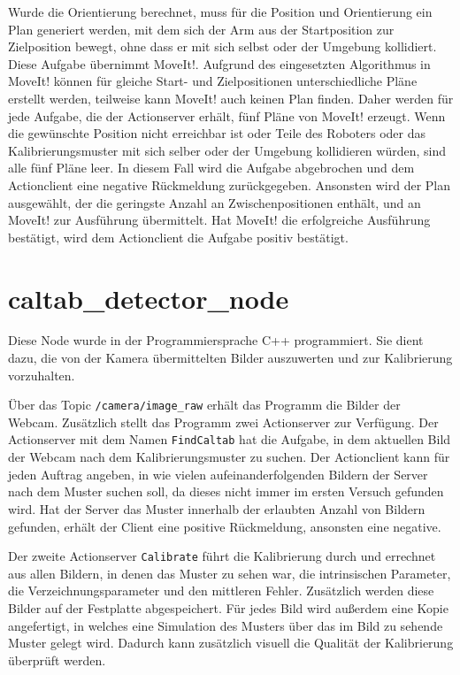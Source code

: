 Wurde die Orientierung berechnet, muss für die Position und Orientierung ein Plan generiert werden, mit dem sich der Arm aus der Startposition zur Zielposition bewegt, ohne dass er mit sich selbst oder der Umgebung kollidiert. Diese Aufgabe übernimmt MoveIt!. Aufgrund des eingesetzten Algorithmus in MoveIt! können für gleiche Start- und Zielpositionen unterschiedliche Pläne erstellt werden, teilweise kann MoveIt! auch keinen Plan finden. Daher werden für jede Aufgabe, die der Actionserver erhält, fünf Pläne von MoveIt! erzeugt. Wenn die gewünschte Position nicht erreichbar ist oder Teile des Roboters oder das Kalibrierungsmuster mit sich selber oder der Umgebung kollidieren würden, sind alle fünf Pläne leer. In diesem Fall wird die Aufgabe abgebrochen und dem Actionclient eine negative Rückmeldung zurückgegeben. Ansonsten wird der Plan ausgewählt, der die geringste Anzahl an Zwischenpositionen enthält, und an MoveIt! zur Ausführung übermittelt. Hat MoveIt! die erfolgreiche Ausführung bestätigt, wird dem Actionclient die Aufgabe positiv bestätigt.

\section{caltab\_detector\_node} %
\label{sec:caltab_detector_node_impl}
Diese Node wurde in der Programmiersprache C++ programmiert. Sie dient dazu, die von der Kamera übermittelten Bilder auszuwerten und zur Kalibrierung vorzuhalten.

Über das Topic \texttt{/camera/image\_raw} erhält das Programm die Bilder der Webcam. Zusätzlich stellt das Programm zwei Actionserver zur Verfügung. Der Actionserver mit dem Namen \texttt{FindCaltab} hat die Aufgabe, in dem aktuellen Bild der Webcam nach dem Kalibrierungsmuster zu suchen. Der Actionclient kann für jeden Auftrag angeben, in wie vielen aufeinanderfolgenden Bildern der Server nach dem Muster suchen soll, da dieses nicht immer im ersten Versuch gefunden wird. Hat der Server das Muster innerhalb der erlaubten Anzahl von Bildern gefunden, erhält der Client eine positive Rückmeldung, ansonsten eine negative.

Der zweite Actionserver \texttt{Calibrate} führt die Kalibrierung durch und errechnet aus allen Bildern, in denen das Muster zu sehen war, die intrinsischen Parameter, die Verzeichnungsparameter und den mittleren Fehler. Zusätzlich werden diese Bilder auf der Festplatte abgespeichert. Für jedes Bild wird außerdem eine Kopie angefertigt, in welches eine Simulation des Musters über das im Bild zu sehende Muster gelegt wird. Dadurch kann zusätzlich visuell die Qualität der Kalibrierung überprüft werden.

